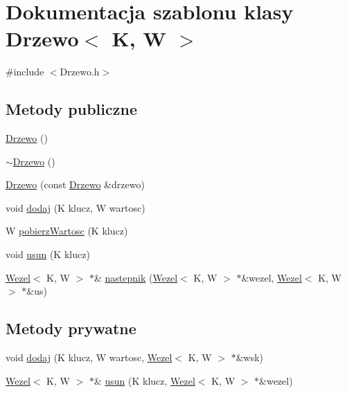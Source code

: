 \hypertarget{class_drzewo}{\section{\-Dokumentacja szablonu klasy \-Drzewo$<$ \-K, \-W $>$}
\label{class_drzewo}
}


{\ttfamily \#include $<$\-Drzewo.\-h$>$}

\subsection*{\-Metody publiczne}
\begin{DoxyCompactItemize}
\item 
\hyperlink{class_drzewo_a123b6a71eed621cac3eaf0be8832472f}{\-Drzewo} ()
\item 
\hyperlink{class_drzewo_af342485cb51b160c303a57fada508642}{$\sim$\-Drzewo} ()
\item 
\hyperlink{class_drzewo_a69255eed324949a2e0dbcda0ea5bd011}{\-Drzewo} (const \hyperlink{class_drzewo}{\-Drzewo} \&drzewo)
\item 
void \hyperlink{class_drzewo_a81d5e253a86cc6e42ab011d3e2157d1a}{dodaj} (\-K klucz, \-W wartosc)
\item 
\-W \hyperlink{class_drzewo_add8d5fe17b7552b3d494fa5b9c49ce6b}{pobierz\-Wartosc} (\-K klucz)
\item 
void \hyperlink{class_drzewo_a7ff767a6ea6bc9c418d1fb24ed0d6276}{usun} (\-K klucz)
\item 
\hyperlink{class_wezel}{\-Wezel}$<$ \-K, \-W $>$ $\ast$\& \hyperlink{class_drzewo_a5e331e1a37bf317c2742b94a34e93b2e}{nastepnik} (\hyperlink{class_wezel}{\-Wezel}$<$ \-K, \-W $>$ $\ast$\&wezel, \hyperlink{class_wezel}{\-Wezel}$<$ \-K, \-W $>$ $\ast$\&us)
\end{DoxyCompactItemize}
\subsection*{\-Metody prywatne}
\begin{DoxyCompactItemize}
\item 
void \hyperlink{class_drzewo_af32cbb347cb334efa59ca8bf83f0c343}{dodaj} (\-K klucz, \-W wartosc, \hyperlink{class_wezel}{\-Wezel}$<$ \-K, \-W $>$ $\ast$\&wsk)
\item 
\hyperlink{class_wezel}{\-Wezel}$<$ \-K, \-W $>$ $\ast$\& \hyperlink{class_drzewo_a0353214a4242185bd700f361246ad928}{usun} (\-K klucz, \hyperlink{class_wezel}{\-Wezel}$<$ \-K, \-W $>$ $\ast$\&wezel)
\end{DoxyCompactItemize}
